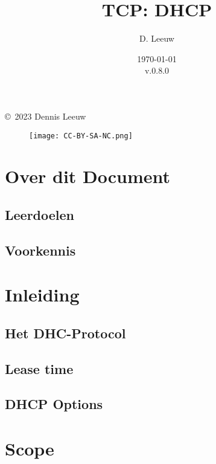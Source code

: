 \documentclass[a4paper,12pt,twoside,openright,titlepage]{book}
\author{D. Leeuw}
\title{TCP: DHCP}
\date{\today\\v.0.8.0}
\begin{document}

\maketitle

\copyright\ 2023 Dennis Leeuw\\

\begin{figure}
\texttt{[image: CC-BY-SA-NC.png]}
\end{figure}

\bigskip




\frontmatter
\chapter{Over dit Document}
\section{Leerdoelen}

\section{Voorkennis}


\tableofcontents

\mainmatter
\chapter{Inleiding}

\section{Het DHC-Protocol}

\section{Lease time}

\section{DHCP Options}


\chapter{Scope}

\end{document}
